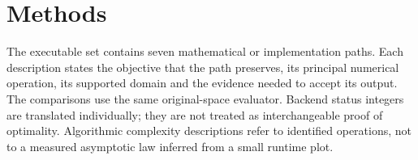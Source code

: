 \section{Methods}\label{sec:methods}
The executable set contains seven mathematical or implementation paths. Each
description states the objective that the path preserves, its principal numerical
operation, its supported domain and the evidence needed to accept its output.
The comparisons use the same original-space evaluator. Backend status integers
are translated individually; they are not treated as interchangeable proof of
optimality. Algorithmic complexity descriptions refer to identified operations,
not to a measured asymptotic law inferred from a small runtime plot.








